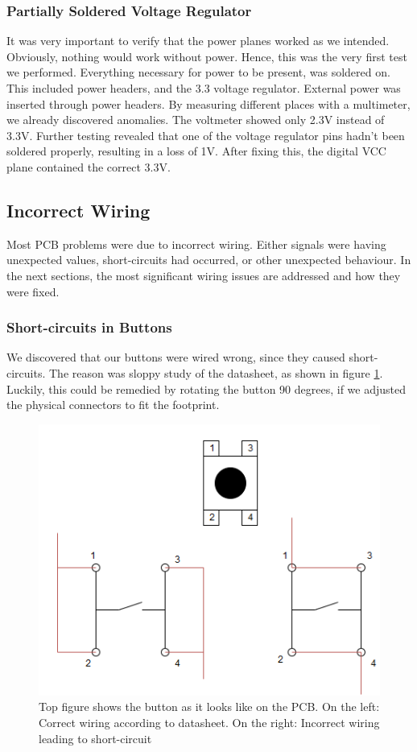 \subsubsection{Partially Soldered Voltage Regulator} 
It was very important to verify that the power planes worked as we intended. Obviously, nothing would work without power. Hence, this was the very first test we performed.
\newline
Everything necessary for power to be present, was soldered on. This included power headers, and the 3.3 voltage regulator. External power was inserted through power headers. By measuring different places with a multimeter, we already discovered anomalies. The voltmeter showed only 2.3V instead of 3.3V. Further testing revealed that one of the voltage regulator pins hadn't been soldered properly, resulting in a loss of 1V. After fixing this, the digital VCC plane contained the correct 3.3V.

\subsection{Incorrect Wiring}
Most PCB problems were due to incorrect wiring. Either signals were having unexpected values, short-circuits had occurred, or other unexpected behaviour. In the next sections, the most significant wiring issues are addressed and how they were fixed.

\subsubsection{Short-circuits in Buttons}
We discovered that our buttons were wired wrong, since they caused short-circuits. The reason was sloppy study of the datasheet, as shown in figure \ref{fig:Button Issue}. Luckily, this could be remedied by rotating the button 90 degrees, if we adjusted the physical connectors to fit the footprint.

\begin{figure}[h!]
\centering
\includegraphics[scale=0.5]{images/Button_Issue.png}
\caption{Top figure shows the button as it looks like on the PCB. On the left: Correct wiring according to datasheet. On the right: Incorrect wiring leading to short-circuit}
\label{fig:Button Issue}
\end{figure}

